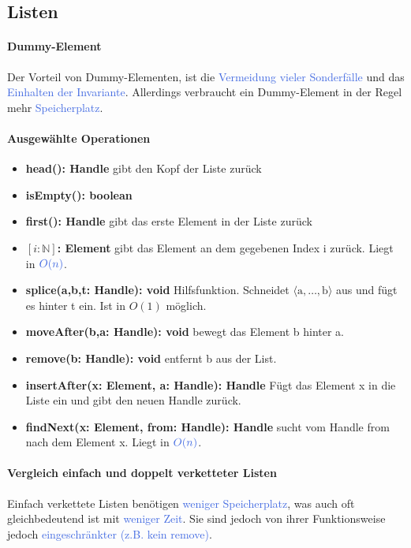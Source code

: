 \documentclass[11pt]{article}
\def \texcol{RoyalBlue}
\begin{document}
\subsection{Listen}

\paragraph{Dummy-Element} Der Vorteil von Dummy-Elementen, ist die \textcolor{\texcol}{Vermeidung vieler Sonderfälle} und das \textcolor{\texcol}{Einhalten der Invariante}. Allerdings verbraucht ein Dummy-Element in der Regel mehr \textcolor{\texcol}{Speicherplatz}.

\paragraph{Ausgewählte Operationen}
\begin{itemize}
\item \textbf{head(): Handle} gibt den Kopf der Liste zurück
\item \textbf{isEmpty(): boolean}
\item \textbf{first(): Handle} gibt das erste Element in der Liste zurück
\item \textbf{$[i: \mathbb{N}]$: Element} gibt das Element an dem gegebenen Index i zurück. Liegt in $\textcolor{\texcol}{O(n)}$.
\item \textbf{splice(a,b,t: Handle): void} Hilfsfunktion. Schneidet $\langle \text{a},\dots,\text{b}\rangle$ aus und fügt es hinter t ein. Ist in $O(1)$ möglich.
\item \textbf{moveAfter(b,a: Handle): void} bewegt das Element b hinter a.
\item \textbf{remove(b: Handle): void} entfernt b aus der List.
\item \textbf{insertAfter(x: Element, a: Handle): Handle} Fügt das Element x in die Liste ein und gibt den neuen Handle zurück.
\item \textbf{findNext(x: Element, from: Handle): Handle} sucht vom Handle from nach dem Element x. Liegt in $\textcolor{\texcol}{O(n)}$.
\end{itemize}

\paragraph{Vergleich einfach und doppelt verketteter Listen} Einfach verkettete Listen benötigen \textcolor{\texcol}{weniger Speicherplatz}, was auch oft gleichbedeutend ist mit \textcolor{\texcol}{weniger Zeit}. Sie sind jedoch von ihrer Funktionsweise jedoch \textcolor{\texcol}{eingeschränkter (z.B. kein remove)}.
\end{document}
